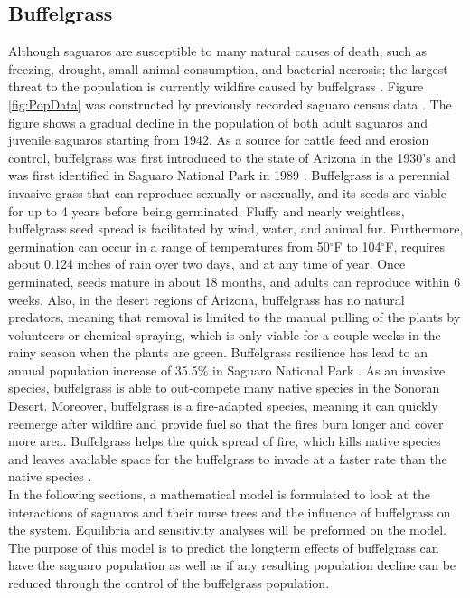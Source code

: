 \documentclass[a4paper]{article}
\begin{document}
\subsection{Buffelgrass}
Although saguaros are susceptible to many natural causes of death, such as freezing, drought, small animal consumption, and bacterial necrosis; the largest threat to the population is currently wildfire caused by buffelgrass \cite{Orum}. Figure \ref{fig:PopData} was constructed by previously recorded saguaro census data \cite{Orum,OrumData}. The figure shows a gradual decline in the population of both adult saguaros and juvenile saguaros starting from 1942. As a source for cattle feed and erosion control, buffelgrass was first introduced to the state of Arizona in the 1930's and was first identified in Saguaro National Park in 1989 \cite{NPSbuffel}. Buffelgrass is a perennial invasive grass that can reproduce sexually or asexually, and its seeds are viable for up to 4 years before being germinated. Fluffy and nearly weightless, buffelgrass seed spread is facilitated by wind, water, and animal fur. Furthermore, germination can occur in a range of temperatures from 50$^{\circ}$F to 104$^{\circ}$F, requires about 0.124 inches of rain over two days, and at any time of year. Once germinated, seeds mature in about 18 months, and adults can reproduce within 6 weeks. Also, in the desert regions of Arizona, buffelgrass has no natural predators, meaning that removal is limited to the manual pulling of the plants by volunteers or chemical spraying, which is only viable for a couple weeks in the rainy season when the plants are green. Buffelgrass resilience has lead to an annual population increase of 35.5\% in Saguaro National Park \cite{NPSbuffelFact}. As an invasive species, buffelgrass is able to out-compete many native species in the Sonoran Desert. Moreover, buffelgrass is a fire-adapted species, meaning it can quickly reemerge after wildfire and provide fuel so that the fires burn longer and cover more area. Buffelgrass helps the quick spread of fire, which kills native species and leaves available space for the buffelgrass to invade at a faster rate than the native species \cite{buffelFireInfo}.\\

In the following sections, a mathematical model is formulated to look at the interactions of saguaros and their nurse trees and the influence of buffelgrass on the system. Equilibria and sensitivity analyses will be preformed on the model. The purpose of this model is to predict the longterm effects of buffelgrass can have the saguaro population as well as if any resulting population decline can be reduced through the control of the buffelgrass population.\\
\end{document}
